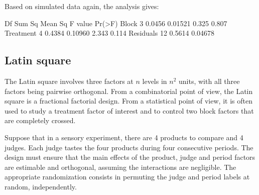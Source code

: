 \documentclass[a4paper]{article}
\begin{document}
Based on simulated data again, the analysis gives:
\begin{Schunk}
\begin{Soutput}
            Df Sum Sq Mean Sq F value Pr(>F)
Block        3 0.0456 0.01521   0.325  0.807
Treatment    4 0.4384 0.10960   2.343  0.114
Residuals   12 0.5614 0.04678               
\end{Soutput}
\end{Schunk}

\subsection{Latin square}
The Latin square involves three factors at $n$ levels in $n^2$ units,
with all three factors being pairwise orthogonal. From a combinatorial
point of view, the Latin square is a fractional factorial design. From
a statistical point of view, it is often used to study a treatment
factor of interest and to control two block factors that are
completely crossed.

Suppose that in a sensory experiment, there are 4 products to compare
and 4 judges. Each judge tastes the four products during four
consecutive periods. The design must ensure that the main effects of
the product, judge and period factors are estimable and orthogonal,
assuming the interactions are negligible. The appropriate
randomization consists in permuting the judge and period
labels at random, independently. 
\end{document}
